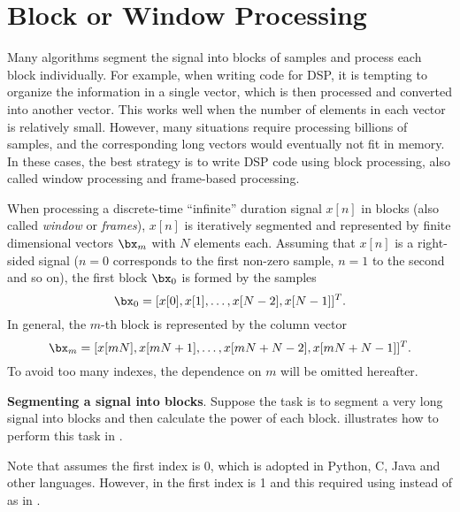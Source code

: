 \section{Block or Window Processing}
\label{sec:block_proc}
Many algorithms segment the signal into blocks of samples and process each block individually. For example, when writing  {\matlab} code for DSP, it is tempting to organize the information in a single vector, which is then processed and converted into another vector. This works well when the number of elements in each vector is relatively small. However, many situations require processing billions of samples, and the corresponding long vectors would eventually not fit in memory. In these cases, the best strategy is to write DSP code using block processing, also called window processing and frame-based processing.

When processing a discrete-time ``infinite'' duration signal $x[n]$  in blocks (also called \emph{window} or \emph{frames}), $x[n]$  is iteratively segmented and represented by finite dimensional vectors $\bx_m$ with $N$ elements each. 
Assuming that $x[n]$ is a right-sided signal ($n=0$ corresponds to the first non-zero sample, $n=1$ to the second and so on), the first block $\bx_0$ is formed by the samples
\[
\bx_0 = [x[0], x[1], \ldots, x[N-2], x[N-1]]^T.
\]
In general, the $m$-th block is represented by the column vector
\begin{equation}
\bx_m = [x[mN], x[mN+1], \ldots, x[mN+N-2], x[mN+N-1]]^T.
\label{eq:block_processing}
\end{equation}
To avoid too many indexes, the dependence on $m$ will be omitted hereafter.

\bExample \textbf{Segmenting a signal into blocks}.
Suppose the task is to segment a very long signal into blocks and then calculate the power of
each block.
 illustrates how to perform this task in {\matlab}.


Note that  assumes the first index is 0, which is adopted
in Python, C, Java and other languages. However, in {\matlab} the first index is 1 and this required using  instead of  as in . 

